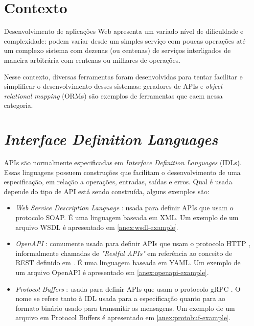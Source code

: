 \section{Contexto}

Desenvolvimento de aplicações Web apresenta um variado nível de dificuldade e
complexidade: podem variar desde um simples serviço com poucas operações até
um complexo sistema com dezenas (ou centenas) de serviços interligados de maneira
arbitrária com centenas ou milhares de operações.

Nesse contexto, diversas ferramentas foram desenvolvidas para tentar facilitar
e simplificar o desenvolvimento desses sistemas: geradores de APIs e \textit{object-relational
mapping} (ORMs) são exemplos de ferramentas que caem nessa categoria.

\section{\textit{Interface Definition Languages}}

APIs são normalmente especificadas em \textit{Interface Definition Languages}
(IDLs). Essas linguagens possuem construções que facilitam o desenvolvimento de uma
especificação, em relação a operações, entradas, saídas e erros. Qual é usada
depende do tipo de API está sendo construída, alguns exemplos são:

\begin{itemize}
\item
  \textit{Web Service Description Language} \cite{wsdl:spec}: usada para
    definir APIs que usam o protocolo SOAP. É uma linguagem baseada em XML.
    Um exemplo de um arquivo WSDL é apresentado em \cref{anex:wsdl-example}.
\item
  \textit{OpenAPI} \cite{openapi:spec}: comumente usada para definir APIs que usam
    o protocolo HTTP \cite{rfc2616}, informalmente chamadas de \textit{"Restful APIs"}
    em referência ao conceito de REST definido em \cite{10.5555/932295}. É uma linguagem
    baseada em YAML. Um exemplo de um arquivo OpenAPI é apresentado em \cref{anex:openapi-example}.
\item
  \textit{Protocol Buffers} \cite{googl:protobuf}: usada para definir APIs que usam
    o protocolo gRPC \cite{googl:grpc}. O nome se refere tanto à IDL usada para a
    especificação quanto para ao formato binário usado para transmitir as mensagens.
    Um exemplo de um arquivo em Protocol Buffers é apresentado em \cref{anex:protobuf-example}.
\end{itemize}

